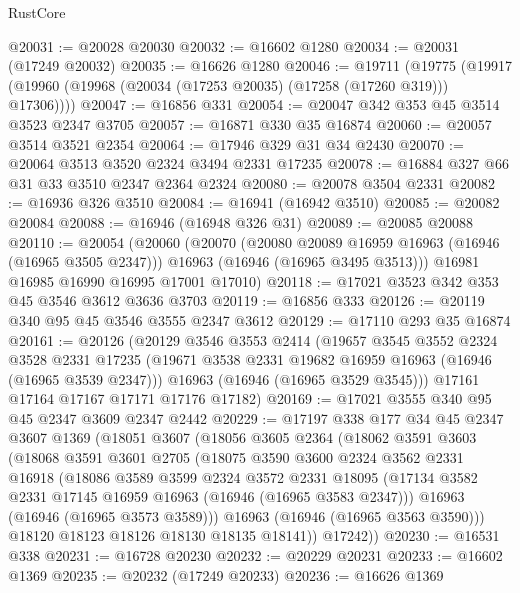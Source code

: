 \begin{lexlean}{RustCore}
\begin{coremodule}
@20031 := @20028 @20030
@20032 := @16602 @1280
@20034 := @20031 (@17249 @20032)
@20035 := @16626 @1280
@20046 := @19711
    (@19775 (@19917 (@19960 (@19968 (@20034 (@17253 @20035) (@17258 (@17260 @319))) @17306))))
@20047 := @16856 @331
@20054 := @20047 @342 @353 @45 @3514 @3523 @2347 @3705
@20057 := @16871 @330 @35 @16874
@20060 := @20057 @3514 @3521 @2354
@20064 := @17946 @329 @31 @34 @2430
@20070 := @20064 @3513 @3520 @2324 @3494 @2331 @17235
@20078 := @16884 @327 @66 @31 @33 @3510 @2347 @2364 @2324
@20080 := @20078 @3504 @2331
@20082 := @16936 @326 @3510
@20084 := @16941 (@16942 @3510)
@20085 := @20082 @20084
@20088 := @16946 (@16948 @326 @31)
@20089 := @20085 @20088
@20110 := @20054
    (@20060
      (@20070
        (@20080 @20089 @16959 @16963 (@16946 (@16965 @3505 @2347)))
        @16963
        (@16946 (@16965 @3495 @3513)))
      @16981
      @16985
      @16990
      @16995
      @17001
      @17010)
@20118 := @17021 @3523 @342 @353 @45 @3546 @3612 @3636 @3703
@20119 := @16856 @333
@20126 := @20119 @340 @95 @45 @3546 @3555 @2347 @3612
@20129 := @17110 @293 @35 @16874
@20161 := @20126
    (@20129
      @3546
      @3553
      @2414
      (@19657
        @3545
        @3552
        @2324
        @3528
        @2331
        @17235
        (@19671 @3538 @2331 @19682 @16959 @16963 (@16946 (@16965 @3539 @2347)))
        @16963
        (@16946 (@16965 @3529 @3545)))
      @17161
      @17164
      @17167
      @17171
      @17176
      @17182)
@20169 := @17021 @3555 @340 @95 @45 @2347 @3609 @2347 @2442
@20229 := @17197
    @338
    @177
    @34
    @45
    @2347
    @3607
    @1369
    (@18051
      @3607
      (@18056
        @3605
        @2364
        (@18062
          @3591
          @3603
          (@18068
            @3591
            @3601
            @2705
            (@18075
              @3590
              @3600
              @2324
              @3562
              @2331
              @16918
              (@18086
                @3589
                @3599
                @2324
                @3572
                @2331
                @18095
                (@17134 @3582 @2331 @17145 @16959 @16963 (@16946 (@16965 @3583 @2347)))
                @16963
                (@16946 (@16965 @3573 @3589)))
              @16963
              (@16946 (@16965 @3563 @3590)))
            @18120
            @18123
            @18126
            @18130
            @18135
            @18141))
        @17242))
@20230 := @16531 @338
@20231 := @16728 @20230
@20232 := @20229 @20231
@20233 := @16602 @1369
@20235 := @20232 (@17249 @20233)
@20236 := @16626 @1369

\end{coremodule}
\end{lexlean}
